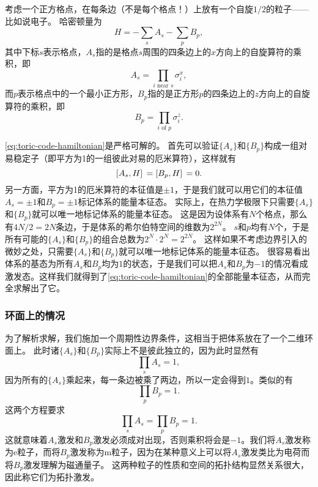 \documentclass[hyperref, UTF8, a4paper]{ctexart}
\begin{document}
考虑一个正方格点，在每条边（不是每个格点！）上放有一个自旋$1/2$的粒子——比如说电子。
哈密顿量为
\begin{equation}
    {H} = - \sum_s {A}_s - \sum_p {B}_p,
    \label{eq:toric-code-hamiltonian}
\end{equation}
其中下标$s$表示格点，${A}_s$指的是格点$s$周围的四条边上的$x$方向上的自旋算符的乘积，即
\begin{equation}
    {A}_s = \prod_{i\text{ near } s} {\sigma}_i^x,
\end{equation}
而$p$表示格点中的一个最小正方形，${B}_p$指的是正方形$p$的四条边上的$z$方向上的自旋算符的乘积，即
\begin{equation}
    {B}_p = \prod_\text{$i$ of $p$} {\sigma}_i^z.
\end{equation}

\eqref{eq:toric-code-hamiltonian}是严格可解的。
首先可以验证$\{{A}_s\}$和$\{{B}_p\}$构成一组对易稳定子（即平方为1的一组彼此对易的厄米算符），这样就有
\begin{equation}
    \comm*{{A}_s}{{H}} = \comm*{{B}_p}{{H}} = 0.
\end{equation}
另一方面，平方为1的厄米算符的本征值是$\pm 1$，于是我们就可以用它们的本征值$A_s = \pm 1$和$B_p = \pm 1$标记体系的能量本征态。
实际上，在热力学极限下只需要$\{A_s\}$和$\{B_p\}$就可以唯一地标记体系的能量本征态。
这是因为设体系有$N$个格点，那么有$4N/2=2N$条边，于是体系的希尔伯特空间的维数为$2^{2N}$。
$s$和$p$均有$N$个，于是所有可能的$\{A_s\}$和$\{B_p\}$的组合总数为$2^N \cdot 2^N=2^{2N}$。
这样如果不考虑边界引入的微妙之处，只需要$\{A_s\}$和$\{B_p\}$就可以唯一地标记体系的能量本征态。
很容易看出体系的基态为所有$A_s$和$B_p$均为$1$的状态，于是我们可以把$A_s$和$B_p$为$-1$的情况看成激发态。这样我们就得到了\eqref{eq:toric-code-hamiltonian}的全部能量本征态，从而完全求解出了它。

\subsubsection{环面上的情况}

为了解析求解，我们施加一个周期性边界条件，这相当于把体系放在了一个二维环面上。
此时诸$\{A_s\}$和$\{B_p\}$实际上不是彼此独立的，因为此时显然有
\[
    \prod_s {A}_s = 1,
\]
因为所有的$\{A_s\}$乘起来，每一条边被乘了两边，所以一定会得到$1$。类似的有
\[
    \prod_p {B}_p = 1.
\]
这两个方程要求
\begin{equation}
    \prod_{s} A_s = \prod_{p} B_p = 1.
    \label{eq:toric-code-pair-condition}
\end{equation}
这就意味着$A_s$激发和$B_p$激发必须成对出现，否则乘积将会是$-1$。我们将$A_s$激发称为e粒子，而将$B_p$激发称为m粒子，因为在某种意义上可以将$A_s$激发类比为电荷而将$B_p$激发理解为磁通量子。
这两种粒子的性质和空间的拓扑结构显然关系很大，因此称它们为拓扑激发。
\end{document}
